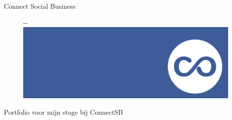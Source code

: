 \pagestyle{fancy}
\fancyhf{}
\lfoot{\thepage}




\begin{center}

{\Huge Connect Social Business\par}
\begin{figure}[!ht]
\begin{adjustwidth}{-\oddsidemargin-1in}{-\rightmargin}
\centering
\includegraphics[width=\paperwidth]{attachments/connectsblogo}
\end{adjustwidth}
\end{figure}

Portfolio voor mijn stage bij ConnectSB

\end{center}
\thispagestyle{empty}
\clearpage

